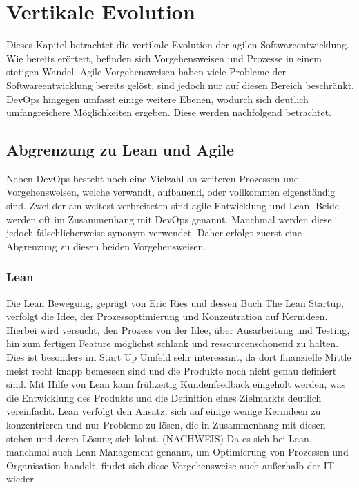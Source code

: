 \chapter{Vertikale Evolution} %
Dieses Kapitel betrachtet die vertikale Evolution der agilen Softwareentwicklung. Wie bereits erörtert, befinden sich Vorgehensweisen und Prozesse in einem stetigen Wandel. Agile Vorgehensweisen haben viele Probleme der Softwareentwicklung bereits gelöst, sind jedoch nur auf diesen Bereich beschränkt. DevOps hingegen umfasst einige weitere Ebenen, wodurch sich deutlich umfangreichere Möglichkeiten ergeben. Diese werden nachfolgend betrachtet.

\section{Abgrenzung zu Lean und Agile} %
Neben DevOps besteht noch eine Vielzahl an weiteren Prozessen und Vorgehensweisen, welche verwandt, aufbauend, oder vollkommen eigenständig sind. Zwei der am weitest verbreiteten sind agile Entwicklung und Lean. Beide werden oft im Zusammenhang mit DevOps genannt. Manchmal werden diese jedoch fälschlicherweise synonym verwendet. Daher erfolgt zuerst eine Abgrenzung zu diesen beiden Vorgehensweisen.

\subsection{Lean}
Die Lean Bewegung, geprägt von Eric Ries und dessen Buch \glqq The Lean Startup\grqq, verfolgt die Idee, der Prozessoptimierung und Konzentration auf Kernideen. Hierbei wird versucht, den Prozess von der Idee, über Ausarbeitung und Testing, hin zum fertigen Feature möglichst schlank und ressourcenschonend zu halten. Dies ist besonders im Start Up Umfeld sehr interessant, da dort finanzielle Mittle meist recht knapp bemessen sind und die Produkte noch nicht genau definiert sind. Mit Hilfe von Lean kann frühzeitig Kundenfeedback eingeholt werden, was die Entwicklung des Produkts und die Definition eines Zielmarkts deutlich vereinfacht.
Lean verfolgt den Ansatz, sich auf einige wenige Kernideen zu konzentrieren und nur Probleme zu lösen, die in Zusammenhang mit diesen stehen und deren Lösung sich lohnt. (NACHWEIS)
Da es sich bei Lean, manchmal auch Lean Management genannt, um Optimierung von Prozessen und Organisation handelt, findet sich diese Vorgehensweise auch außerhalb der IT wieder.

